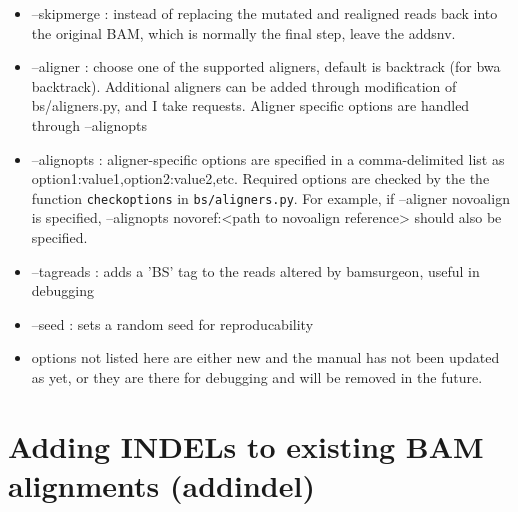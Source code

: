 \documentclass[letterpaper,11pt]{article}
\begin{document}
\begin{itemize}
\item --skipmerge : instead of replacing the mutated and realigned reads back into the original BAM, which is normally the final step, leave the addsnv.
\item --aligner : choose one of the supported aligners, default is backtrack (for bwa backtrack). Additional aligners can be added through modification of bs/aligners.py, and I take requests. Aligner specific options are handled through --alignopts
\item --alignopts : aligner-specific options are specified in a comma-delimited list as option1:value1,option2:value2,etc. Required options are checked by the the function \texttt{checkoptions} in \texttt{bs/aligners.py}. For example, if --aligner novoalign is specified, --alignopts novoref:<path to novoalign reference> should also be specified.
\item --tagreads : adds a 'BS' tag to the reads altered by bamsurgeon, useful in debugging
\item --seed : sets a random seed for reproducability
\item options not listed here are either new and the manual has not been updated as yet, or they are there for debugging and will be removed in the future.
\end{itemize}


\section{Adding INDELs to existing BAM alignments (addindel)}
\end{document}
